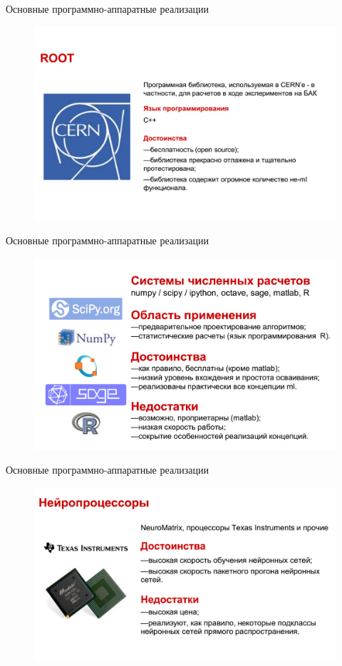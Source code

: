 \documentclass{beamer}
\begin{document}
\begin{frame}[t]{Основные программно-аппаратные реализации}
\begin{figure}[h]
\centering
\includegraphics[scale=0.35]{images/lec01-pic14.png}
\end{figure}
\end{frame}

\begin{frame}[t]{Основные программно-аппаратные реализации}
\begin{figure}[h]
\centering
\includegraphics[scale=0.35]{images/lec01-pic15.png}
\end{figure}
\end{frame}

\begin{frame}[t]{Основные программно-аппаратные реализации}
\begin{figure}[h]
\centering
\includegraphics[scale=0.35]{images/lec01-pic16.png}
\end{figure}
\end{frame}
\end{document}
